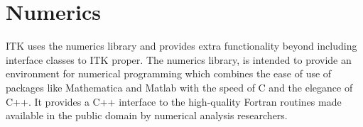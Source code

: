 

%
%
\section{Numerics}
\label{sec:Numerics}

ITK uses the  numerics library and provides extra functionality
beyond  including interface classes to ITK proper.  The numerics
library,  is intended to provide an environment for numerical
programming which combines the ease of use of packages like Mathematica and
Matlab with the speed of C and the elegance of C++. It provides a C++
interface to the high-quality Fortran routines made available in the public
domain by numerical analysis researchers.

